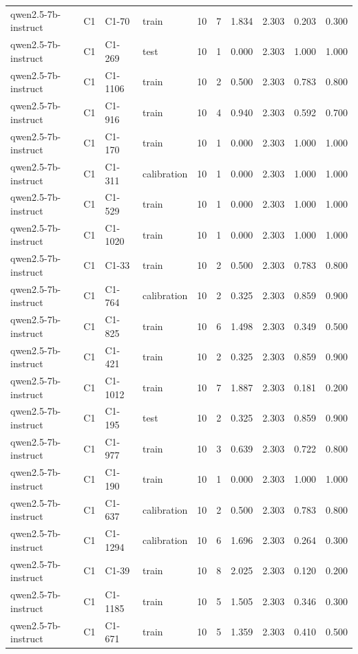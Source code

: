 \begin{table}
\begin{tabular}{llllrrrrrr}
qwen2.5-7b-instruct & C1 & C1-70 & train & 10 & 7 & 1.834 & 2.303 & 0.203 & 0.300 \\
qwen2.5-7b-instruct & C1 & C1-269 & test & 10 & 1 & 0.000 & 2.303 & 1.000 & 1.000 \\
qwen2.5-7b-instruct & C1 & C1-1106 & train & 10 & 2 & 0.500 & 2.303 & 0.783 & 0.800 \\
qwen2.5-7b-instruct & C1 & C1-916 & train & 10 & 4 & 0.940 & 2.303 & 0.592 & 0.700 \\
qwen2.5-7b-instruct & C1 & C1-170 & train & 10 & 1 & 0.000 & 2.303 & 1.000 & 1.000 \\
qwen2.5-7b-instruct & C1 & C1-311 & calibration & 10 & 1 & 0.000 & 2.303 & 1.000 & 1.000 \\
qwen2.5-7b-instruct & C1 & C1-529 & train & 10 & 1 & 0.000 & 2.303 & 1.000 & 1.000 \\
qwen2.5-7b-instruct & C1 & C1-1020 & train & 10 & 1 & 0.000 & 2.303 & 1.000 & 1.000 \\
qwen2.5-7b-instruct & C1 & C1-33 & train & 10 & 2 & 0.500 & 2.303 & 0.783 & 0.800 \\
qwen2.5-7b-instruct & C1 & C1-764 & calibration & 10 & 2 & 0.325 & 2.303 & 0.859 & 0.900 \\
qwen2.5-7b-instruct & C1 & C1-825 & train & 10 & 6 & 1.498 & 2.303 & 0.349 & 0.500 \\
qwen2.5-7b-instruct & C1 & C1-421 & train & 10 & 2 & 0.325 & 2.303 & 0.859 & 0.900 \\
qwen2.5-7b-instruct & C1 & C1-1012 & train & 10 & 7 & 1.887 & 2.303 & 0.181 & 0.200 \\
qwen2.5-7b-instruct & C1 & C1-195 & test & 10 & 2 & 0.325 & 2.303 & 0.859 & 0.900 \\
qwen2.5-7b-instruct & C1 & C1-977 & train & 10 & 3 & 0.639 & 2.303 & 0.722 & 0.800 \\
qwen2.5-7b-instruct & C1 & C1-190 & train & 10 & 1 & 0.000 & 2.303 & 1.000 & 1.000 \\
qwen2.5-7b-instruct & C1 & C1-637 & calibration & 10 & 2 & 0.500 & 2.303 & 0.783 & 0.800 \\
qwen2.5-7b-instruct & C1 & C1-1294 & calibration & 10 & 6 & 1.696 & 2.303 & 0.264 & 0.300 \\
qwen2.5-7b-instruct & C1 & C1-39 & train & 10 & 8 & 2.025 & 2.303 & 0.120 & 0.200 \\
qwen2.5-7b-instruct & C1 & C1-1185 & train & 10 & 5 & 1.505 & 2.303 & 0.346 & 0.300 \\
qwen2.5-7b-instruct & C1 & C1-671 & train & 10 & 5 & 1.359 & 2.303 & 0.410 & 0.500 \\

\end{tabular}
\end{table}
